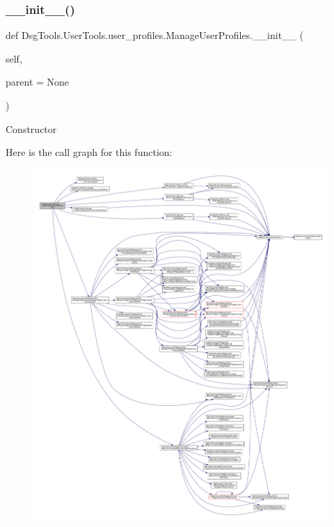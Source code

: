 \subsubsection{\texorpdfstring{\+\_\+\+\_\+init\+\_\+\+\_\+()}{\_\_init\_\_()}}
{\footnotesize\ttfamily def Dsg\+Tools.\+User\+Tools.\+user\+\_\+profiles.\+Manage\+User\+Profiles.\+\_\+\+\_\+init\+\_\+\+\_\+ (\begin{DoxyParamCaption}\item[{}]{self,  }\item[{}]{parent = {\ttfamily None} }\end{DoxyParamCaption})}

\begin{DoxyVerb}Constructor
\end{DoxyVerb}
 Here is the call graph for this function\+:
\nopagebreak
\begin{figure}[H]
\begin{center}
\leavevmode
\includegraphics[width=350pt]{class_dsg_tools_1_1_user_tools_1_1user__profiles_1_1_manage_user_profiles_a1887fc986ce95413f9257b52fe64fbe0_cgraph}
\end{center}
\end{figure}



